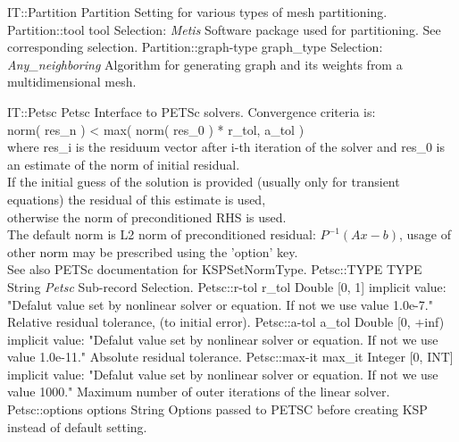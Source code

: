 \begin{RecordType}
	{IT::Partition}
	{Partition}
	{} %
	{} %
	{{{Setting for various types of mesh partitioning.}}}
		\RecKey
			{Partition::tool}
			{tool}
			{{Selection}{: }}
			{ \it{Metis} }
			{{{Software package used for partitioning. See corresponding selection.}}}
		\RecKey
			{Partition::graph-type}
			{graph{\_}type}
			{{Selection}{: }}
			{ \it{Any{\_}neighboring} }
			{{{Algorithm for generating graph and its weights from a multidimensional mesh.}}}
\end{RecordType}
\begin{RecordType}
	{IT::Petsc}
	{Petsc}
	{} %
	{} %
	{{{Interface to PETSc solvers. Convergence criteria is:}\\
\ttfamily norm( res{\_}n )  {\textless} max( norm( res{\_}0 ) * r{\_}tol, a{\_}tol )\\{
where res{\_}i is the residuum vector after i-th iteration of the solver and res{\_}0 is an estimate of the norm of initial residual.}\\{
If the initial guess of the solution is provided (usually only for transient equations) the residual of this estimate is used,}\\{
otherwise the norm of preconditioned RHS is used.}\\{
The default norm is L2 norm of preconditioned residual: }{$ P^{-1}(Ax-b)$}{, usage of other norm may be prescribed using the 'option' key.}\\{
See also PETSc documentation for KSPSetNormType.}}}
		\RecKey
			{Petsc::TYPE}
			{TYPE}
			{{String}}
			{ \it{Petsc} }
			{{{Sub-record Selection.}}}
		\RecKey
			{Petsc::r-tol}
			{r{\_}tol}
			{{Double [0, 1]}}
			{implicit value: "{Defalut value set by nonlinear solver or equation. If not we use value 1.0e-7.}"}
			{{{Relative residual tolerance,  (to initial error).}}}
		\RecKey
			{Petsc::a-tol}
			{a{\_}tol}
			{{Double [0, +inf)}}
			{implicit value: "{Defalut value set by nonlinear solver or equation. If not we use value 1.0e-11.}"}
			{{{Absolute residual tolerance.}}}
		\RecKey
			{Petsc::max-it}
			{max{\_}it}
			{{Integer [0, INT]}}
			{implicit value: "{Defalut value set by nonlinear solver or equation. If not we use value 1000.}"}
			{{{Maximum number of outer iterations of the linear solver.}}}
		\RecKey
			{Petsc::options}
			{options}
			{{String}}
			{ \it{} }
			{{{Options passed to PETSC before creating KSP instead of default setting.}}}
\end{RecordType}
